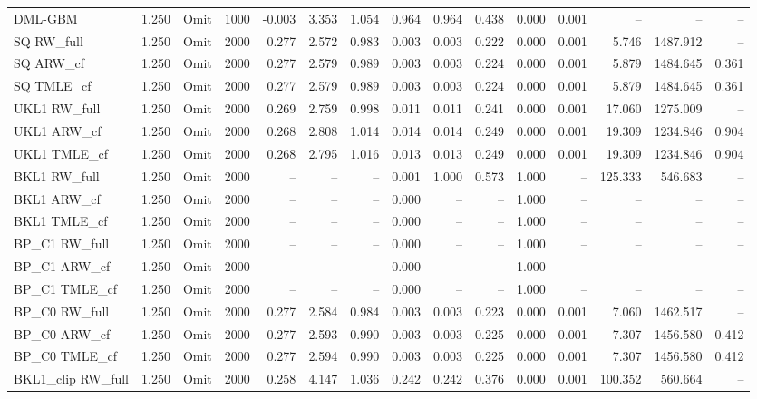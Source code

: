 \begin{tabular}{llllrrrrrrrrrrr}
DML-GBM & 1.250 & Omit & 1000 & -0.003 & 3.353 & 1.054 & 0.964 & 0.964 & 0.438 & 0.000 & 0.001 & -- & -- & -- \\
SQ RW\_full & 1.250 & Omit & 2000 & 0.277 & 2.572 & 0.983 & 0.003 & 0.003 & 0.222 & 0.000 & 0.001 & 5.746 & 1487.912 & -- \\
SQ ARW\_cf & 1.250 & Omit & 2000 & 0.277 & 2.579 & 0.989 & 0.003 & 0.003 & 0.224 & 0.000 & 0.001 & 5.879 & 1484.645 & 0.361 \\
SQ TMLE\_cf & 1.250 & Omit & 2000 & 0.277 & 2.579 & 0.989 & 0.003 & 0.003 & 0.224 & 0.000 & 0.001 & 5.879 & 1484.645 & 0.361 \\
UKL1 RW\_full & 1.250 & Omit & 2000 & 0.269 & 2.759 & 0.998 & 0.011 & 0.011 & 0.241 & 0.000 & 0.001 & 17.060 & 1275.009 & -- \\
UKL1 ARW\_cf & 1.250 & Omit & 2000 & 0.268 & 2.808 & 1.014 & 0.014 & 0.014 & 0.249 & 0.000 & 0.001 & 19.309 & 1234.846 & 0.904 \\
UKL1 TMLE\_cf & 1.250 & Omit & 2000 & 0.268 & 2.795 & 1.016 & 0.013 & 0.013 & 0.249 & 0.000 & 0.001 & 19.309 & 1234.846 & 0.904 \\
BKL1 RW\_full & 1.250 & Omit & 2000 & -- & -- & -- & 0.001 & 1.000 & 0.573 & 1.000 & -- & 125.333 & 546.683 & -- \\
BKL1 ARW\_cf & 1.250 & Omit & 2000 & -- & -- & -- & 0.000 & -- & -- & 1.000 & -- & -- & -- & -- \\
BKL1 TMLE\_cf & 1.250 & Omit & 2000 & -- & -- & -- & 0.000 & -- & -- & 1.000 & -- & -- & -- & -- \\
BP\_C1 RW\_full & 1.250 & Omit & 2000 & -- & -- & -- & 0.000 & -- & -- & 1.000 & -- & -- & -- & -- \\
BP\_C1 ARW\_cf & 1.250 & Omit & 2000 & -- & -- & -- & 0.000 & -- & -- & 1.000 & -- & -- & -- & -- \\
BP\_C1 TMLE\_cf & 1.250 & Omit & 2000 & -- & -- & -- & 0.000 & -- & -- & 1.000 & -- & -- & -- & -- \\
BP\_C0 RW\_full & 1.250 & Omit & 2000 & 0.277 & 2.584 & 0.984 & 0.003 & 0.003 & 0.223 & 0.000 & 0.001 & 7.060 & 1462.517 & -- \\
BP\_C0 ARW\_cf & 1.250 & Omit & 2000 & 0.277 & 2.593 & 0.990 & 0.003 & 0.003 & 0.225 & 0.000 & 0.001 & 7.307 & 1456.580 & 0.412 \\
BP\_C0 TMLE\_cf & 1.250 & Omit & 2000 & 0.277 & 2.594 & 0.990 & 0.003 & 0.003 & 0.225 & 0.000 & 0.001 & 7.307 & 1456.580 & 0.412 \\
BKL1\_clip RW\_full & 1.250 & Omit & 2000 & 0.258 & 4.147 & 1.036 & 0.242 & 0.242 & 0.376 & 0.000 & 0.001 & 100.352 & 560.664 & -- \\

\end{tabular}
